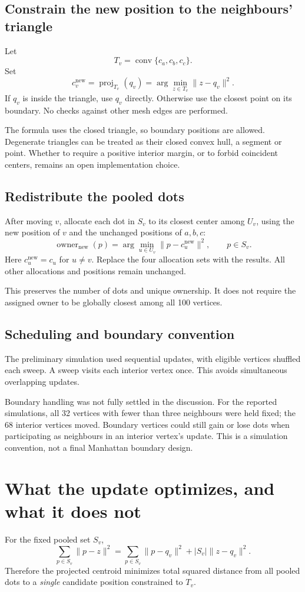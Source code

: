 \documentclass[11pt]{article}
\begin{document}
\subsection{Constrain the new position to the neighbours' triangle}
Let
\[
T_v=\operatorname{conv}\{c_a,c_b,c_c\}.
\]
Set
\[
c_v^{\mathrm{new}}=\operatorname{proj}_{T_v}(q_v)
=\arg\min_{z\in T_v}\|z-q_v\|^2.
\]
If $q_v$ is inside the triangle, use $q_v$ directly. Otherwise use the closest point on its boundary. No checks against other mesh edges are performed.

The formula uses the closed triangle, so boundary positions are allowed. Degenerate triangles can be treated as their closed convex hull, a segment or point. Whether to require a positive interior margin, or to forbid coincident centers, remains an open implementation choice.

\subsection{Redistribute the pooled dots}
After moving $v$, allocate each dot in $S_v$ to its closest center among $U_v$, using the new position of $v$ and the unchanged positions of $a,b,c$:
\[
\operatorname{owner}_{\mathrm{new}}(p)
=\arg\min_{u\in U_v}\|p-c_u^{\mathrm{new}}\|^2,
\qquad p\in S_v.
\]
Here $c_u^{\mathrm{new}}=c_u$ for $u\ne v$. Replace the four allocation sets with the results. All other allocations and positions remain unchanged.

This preserves the number of dots and unique ownership. It does not require the assigned owner to be globally closest among all 100 vertices.

\subsection{Scheduling and boundary convention}
The preliminary simulation used sequential updates, with eligible vertices shuffled each sweep. A sweep visits each interior vertex once. This avoids simultaneous overlapping updates.

Boundary handling was not fully settled in the discussion. For the reported simulations, all 32 vertices with fewer than three neighbours were held fixed; the 68 interior vertices moved. Boundary vertices could still gain or lose dots when participating as neighbours in an interior vertex's update. This is a simulation convention, not a final Manhattan boundary design.

\section{What the update optimizes, and what it does not}
For the fixed pooled set $S_v$,
\[
\sum_{p\in S_v}\|p-z\|^2
=\sum_{p\in S_v}\|p-q_v\|^2+|S_v|\|z-q_v\|^2.
\]
Therefore the projected centroid minimizes total squared distance from all pooled dots to a \emph{single} candidate position constrained to $T_v$.
\end{document}
